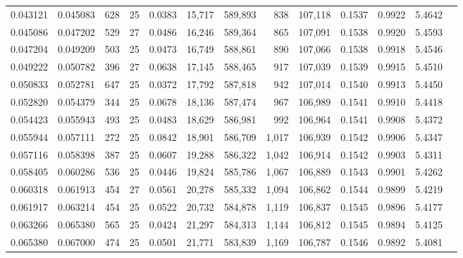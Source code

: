 \begin{tabular}{rrrrrrrrrrrrr}
0.043121 & 0.045083 &   628 &  25 &                                     0.0383 &  15,717 & 589,893 &     838 & 107,118 & 0.1537 & 0.9922 & 5.4642 \\
0.045086 & 0.047202 &   529 &  27 &                                     0.0486 &  16,246 & 589,364 &     865 & 107,091 & 0.1538 & 0.9920 & 5.4593 \\
0.047204 & 0.049209 &   503 &  25 &                                     0.0473 &  16,749 & 588,861 &     890 & 107,066 & 0.1538 & 0.9918 & 5.4546 \\
0.049222 & 0.050782 &   396 &  27 &                                     0.0638 &  17,145 & 588,465 &     917 & 107,039 & 0.1539 & 0.9915 & 5.4510 \\
0.050833 & 0.052781 &   647 &  25 &                                     0.0372 &  17,792 & 587,818 &     942 & 107,014 & 0.1540 & 0.9913 & 5.4450 \\
0.052820 & 0.054379 &   344 &  25 &                                     0.0678 &  18,136 & 587,474 &     967 & 106,989 & 0.1541 & 0.9910 & 5.4418 \\
0.054423 & 0.055943 &   493 &  25 &                                     0.0483 &  18,629 & 586,981 &     992 & 106,964 & 0.1541 & 0.9908 & 5.4372 \\
0.055944 & 0.057111 &   272 &  25 &                                     0.0842 &  18,901 & 586,709 &   1,017 & 106,939 & 0.1542 & 0.9906 & 5.4347 \\
0.057116 & 0.058398 &   387 &  25 &                                     0.0607 &  19,288 & 586,322 &   1,042 & 106,914 & 0.1542 & 0.9903 & 5.4311 \\
0.058405 & 0.060286 &   536 &  25 &                                     0.0446 &  19,824 & 585,786 &   1,067 & 106,889 & 0.1543 & 0.9901 & 5.4262 \\
0.060318 & 0.061913 &   454 &  27 &                                     0.0561 &  20,278 & 585,332 &   1,094 & 106,862 & 0.1544 & 0.9899 & 5.4219 \\
0.061917 & 0.063214 &   454 &  25 &                                     0.0522 &  20,732 & 584,878 &   1,119 & 106,837 & 0.1545 & 0.9896 & 5.4177 \\
0.063266 & 0.065380 &   565 &  25 &                                     0.0424 &  21,297 & 584,313 &   1,144 & 106,812 & 0.1545 & 0.9894 & 5.4125 \\
0.065380 & 0.067000 &   474 &  25 &                                     0.0501 &  21,771 & 583,839 &   1,169 & 106,787 & 0.1546 & 0.9892 & 5.4081 \\

\end{tabular}
